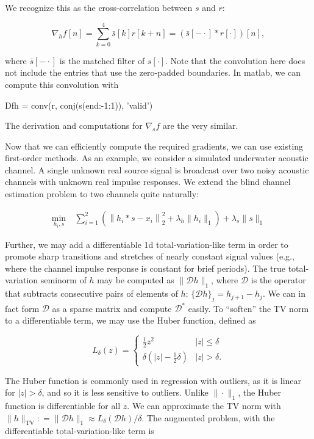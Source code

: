 \documentclass[journal]{IEEEtran}
\newcommand{\defeq}{\mathrel{\mathop:}=}
\begin{document}
\noindent We recognize this as the cross-correlation between $s$ and $r$:

\[ \nabla_h f[n] = \sum_{k=0}^4 \bar{s}[k]r[k+n] = (\bar{s}[-\cdot]\ast r[\cdot])[n], \]

\noindent where $\bar{s}[-\cdot]$ is the matched filter of $s[\cdot]$.  Note that the convolution here does not include the entries that use the zero-padded boundaries.  In {\sc matlab}, we can compute this convolution with

\begin{verb}
   Dfh = conv(r, conj(s(end:-1:1)), 'valid')
\end{verb}

\noindent The derivation and computations for $\nabla_sf$ are the very similar.

Now that we can efficiently compute the required gradients, we can use existing first-order methods.  As an example, we consider a simulated underwater acoustic channel.  A single unknown real source signal is broadcast over two noisy acoustic channels with unknown real impulse responses.  We extend the blind channel estimation problem to two channels quite naturally:

\begin{align*}
   \min_{h_i,s} ~&\sum_{i=1}^2\left(\left\|h_i\ast s - x_i\right\|_2^2 + \lambda_{h}\|h_i\|_1\right) + \lambda_s\|s\|_1
\end{align*}

\noindent Further, we may add a differentiable 1d total-variation-like term in order to promote sharp transitions and stretches of nearly constant signal values (e.g., where the channel impulse response is constant for brief periods).  The true total-variation seminorm of $h$ may be computed as $\|\mathcal{D}h\|_1$, where $\mathcal{D}$ is the operator that subtracts consecutive pairs of elements of $h$: $\{\mathcal{D}h\}_j = h_{j+1} - h_j$.  We can in fact form $\mathcal{D}$ as a sparse matrix and compute $\mathcal{D}^\ast$ easily.  To ``soften'' the TV norm to a differentiable term, we may use the Huber function, defined as

\[ L_\delta(z) = \left\{\begin{array}{ll} \frac{1}{2}z^2 & |z| \le \delta\\ \delta\left(|z| - \frac{1}{2}\delta\right) & |z| > \delta. \end{array}\right. \] 

\noindent The Huber function is commonly used in regression with outliers, as it is linear for $|z|>\delta$, and so it is less sensitive to outliers.  Unlike ${\|\cdot\|_1}$, the Huber function is differentiable for all $z$.  We can approximate the TV norm with ${\|h\|_\text{TV} \defeq\|\mathcal{D}h\|_1 \approx L_\delta(\mathcal{D}h)/\delta}$.  The augmented problem, with the differentiable total-variation-like term is
\end{document}
